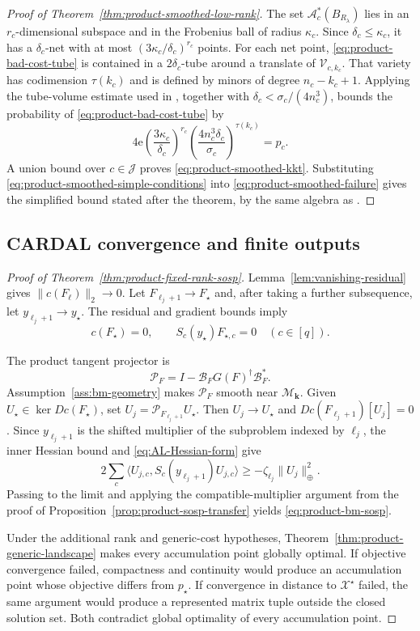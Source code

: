 \documentclass[11pt]{article}
\theoremstyle{definition}
\theoremstyle{remark}
\begin{document}
\begin{proof}[Proof of Theorem~\ref{thm:product-smoothed-low-rank}]
The set $\mathcal A_c^*(B_{R_\lambda})$ lies in an $r_c$-dimensional
subspace and in the Frobenius ball of radius $\kappa_c$.  Since
$\delta_c\leq\kappa_c$, it has a $\delta_c$-net with at most
$(3\kappa_c/\delta_c)^{r_c}$ points.  For each net point,
\eqref{eq:product-bad-cost-tube} is contained in a
$2\delta_c$-tube around a translate of $\mathcal V_{c,k_c}$.
That variety has codimension $\tau(k_c)$ and is defined by minors of degree
$n_c-k_c+1$.  Applying the tube-volume estimate used in
\cite[Theorem~6]{cifuentes2022polynomial}, together with
$\delta_c<\sigma_c/(4n_c^3)$, bounds the probability of
\eqref{eq:product-bad-cost-tube} by
\[
  4\mathrm e
  \left(\frac{3\kappa_c}{\delta_c}\right)^{r_c}
  \left(\frac{4n_c^3\delta_c}{\sigma_c}\right)^{\tau(k_c)}
  =p_c.
\]
A union bound over $c\in\mathcal J$ proves
\eqref{eq:product-smoothed-kkt}.  Substituting
\eqref{eq:product-smoothed-simple-conditions} into
\eqref{eq:product-smoothed-failure} gives the simplified bound stated after
the theorem, by the same algebra as
\cite[Corollary~1]{cifuentes2022polynomial}.
\end{proof}

\subsection{CARDAL convergence and finite outputs}

\begin{proof}[Proof of Theorem~\ref{thm:product-fixed-rank-sosp}]
Lemma~\ref{lem:vanishing-residual} gives
$\|c(F_\ell)\|_2\to0$.  Let
$F_{\ell_j+1}\to F_\star$ and, after taking a further subsequence, let
$y_{\ell_j+1}\to y_\star$.  The residual and gradient bounds imply
\[
  c(F_\star)=0,
  \qquad
  S_c(y_\star)F_{\star,c}=0\quad(c\in[q]).
\]

The product tangent projector is
\[
  \mathcal P_F
  =I-\mathcal B_FG(F)^\dagger\mathcal B_F^*.
\]
Assumption~\ref{ass:bm-geometry} makes $\mathcal P_F$ smooth near
$\mathcal M_{\mathbf k}$.  Given
$U_\star\in\ker Dc(F_\star)$, set
$U_j=\mathcal P_{F_{\ell_j+1}}U_\star$.  Then
$U_j\to U_\star$ and $Dc(F_{\ell_j+1})[U_j]=0$.  Since
$y_{\ell_j+1}$ is the shifted multiplier of the subproblem indexed by
$\ell_j$, the
inner Hessian bound and \eqref{eq:AL-Hessian-form} give
\[
  2\sum_c
  \langle U_{j,c},S_c(y_{\ell_j+1})U_{j,c}\rangle
  \geq-\zeta_{\ell_j}\|U_j\|_\oplus^2.
\]
Passing to the limit and applying the compatible-multiplier argument from
the proof of Proposition~\ref{prop:product-sosp-transfer} yields
\eqref{eq:product-bm-sosp}.

Under the additional rank and generic-cost hypotheses,
Theorem~\ref{thm:product-generic-landscape} makes every accumulation point
globally optimal.  If objective convergence failed, compactness and
continuity would produce an accumulation point whose objective differs from
$p_\star$.  If convergence in distance to $\mathcal X^\star$ failed, the
same argument would produce a represented matrix tuple outside the closed
solution set.  Both contradict global optimality of every accumulation
point.
\end{proof}
\end{document}
